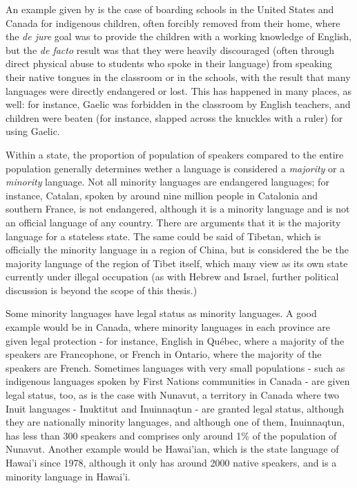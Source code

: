 An example given by \citet{hanks2017policy} is the case of boarding schools in the United States and Canada for indigenous children, often forcibly removed from their home, where the {\it de jure} goal was to provide the children with a working knowledge of English, but the {\it de facto} result was that they were heavily discouraged (often through direct physical abuse to students who spoke in their language) from speaking their native tongues in the classroom or in the schools, with the result that many languages were directly endangered or lost. This has happened in many places, as well: for instance, Gaelic was forbidden in the classroom by English teachers, and children were beaten (for instance, slapped across the knuckles with a ruler) for using Gaelic.

Within a state, the proportion of population of speakers compared to the entire population generally determines wether a language is considered a \textit{majority} or a \textit{minority} language. Not all minority languages are endangered languages; for instance, Catalan, spoken by around nine million people in Catalonia and southern France, is not endangered, although it is a minority language and is not an official language of any country. There are arguments that it is the majority language for a stateless state. The same could be said of Tibetan, which is officially the minority language in a region of China, but is considered the be the majority language of the region of Tibet itself, which many view as its own state currently under illegal occupation (as with Hebrew and Israel, further political discussion is beyond the scope of this thesis.)

Some minority languages have legal status as minority languages. A good example would be in Canada, where minority languages in each province are given legal protection - for instance, English in Qu\'ebec, where a majority of the speakers are Francophone, or French in Ontario, where the majority of the speakers are French. Sometimes languages with very small populations - such as indigenous languages spoken by First Nations communities in Canada - are given legal status, too, as is the case with Nunavut, a territory in Canada where two Inuit languages - Inuktitut and Inuinnaqtun - are granted legal status, although they are nationally minority languages, and although one of them, Inuinnaqtun, has less than 300 speakers and comprises only around 1\% of the population of Nunavut. Another example would be Hawai'ian, which is the state language of Hawai'i since 1978, although it only has around 2000 native speakers, and is a minority language in Hawai'i.


